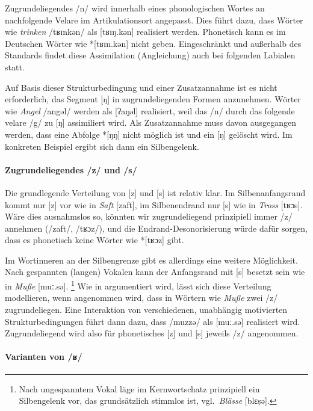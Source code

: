 Zugrundeliegendes /n/ wird innerhalb eines phonologischen Wortes an nachfolgende Velare im Artikulationsort angepasst.
Dies führt dazu, dass Wörter wie \textit{trinken} /tʁɪnkən/ als [tʁɪŋ.kən] realisiert werden.
Phonetisch kann es im Deutschen Wörter wie *[tʁɪn.kən] nicht geben.
Eingeschränkt und außerhalb des Standards findet diese Assimilation (Angleichung) auch bei folgenden Labialen statt.

Auf Basis dieser Strukturbedingung und einer Zusatzannahme ist es nicht erforderlich, das Segment [ŋ] in zugrundeliegenden Formen anzunehmen.
Wörter wie \textit{Angel} /angəl/ werden als [ʔaŋ̣əl] realisiert, weil das /n/ durch das folgende velare /g/  zu [ŋ] assimiliert wird.
Als Zusatzannahme muss davon ausgegangen werden, dass eine Abfolge *[ŋŋ] nicht möglich ist und ein [ŋ] gelöscht wird.
Im konkreten Beispiel ergibt sich dann ein Silbengelenk.

\paragraph*{Zugrundeliegendes /z/ und /s/}

Die grundlegende Verteilung von [z] und [s] ist relativ klar.
Im Silbenanfangsrand kommt nur [z] vor wie in \textit{Saft} [zaft], im Silbenendrand nur [s] wie in \textit{Tross} [tʁɔs].
Wäre dies ausnahmslos so, könnten wir zugrundeliegend prinzipiell immer /z/ annehmen (/zaft/, /tʁɔz/), und die Endrand-Desonorisierung würde dafür sorgen, dass es phonetisch keine Wörter wie *[tʁɔz] gibt.

Im Wortinneren an der Silbengrenze gibt es allerdings eine weitere Möglichkeit.
Nach gespannten (langen) Vokalen kann der Anfangsrand mit [s] besetzt sein wie in \textit{Muße} [muː.sə].%
\footnote{Nach ungespanntem Vokal läge im Kernwortschatz prinzipiell ein Silbengelenk vor, das grundsätzlich stimmlos ist, vgl.\ \textit{Blässe} [blɛṣə].}
Wie in  argumentiert wird, lässt sich diese Verteilung modellieren, wenn angenommen wird, dass in Wörtern wie \textit{Muße} zwei /z/ zugrundeliegen.
Eine Interaktion von verschiedenen, unabhängig motivierten Strukturbedingungen führt dann dazu, dass /muzzə/ als [muː.sə] realisiert wird.
Zugrundeliegend wird also für phonetisches [z] und [s] jeweils /z/ angenommen.

\paragraph*{Varianten von /ʁ/}

